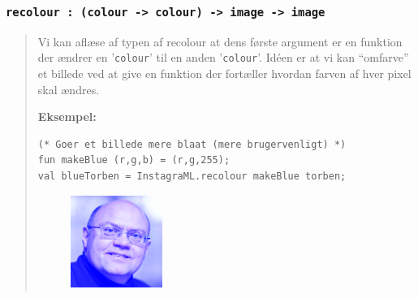 \documentclass[a4paper,12pt]{article}
\begin{document}
\subsubsection*{\texttt{recolour : (colour -> colour) -> image -> image}}
\begin{quotation}
\noindent
Vi kan aflæse af typen af recolour at dens første argument er en
funktion der ændrer en '\verb|colour|' til en anden
'\verb|colour|'. Idéen er at vi kan "`omfarve"' et billede ved at give
en funktion der fortæller hvordan farven af hver pixel skal ændres.

\vspace{1em}
\noindent
\textbf{Eksempel:}
\begin{lstlisting}
(* Goer et billede mere blaat (mere brugervenligt) *)
fun makeBlue (r,g,b) = (r,g,255);
val blueTorben = InstagraML.recolour makeBlue torben;
\end{lstlisting}
\begin{figure}[h!]
  \centering
  \includegraphics[width=3cm]{uge3_blaaTorben.png}
\end{figure}
\end{quotation}



\end{document}
